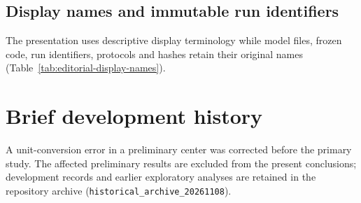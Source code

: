 \documentclass[smallextended,epjc3]{svjour3}
\begin{document}
\subsection{Display names and immutable run identifiers}
\label{sec:display_mapping}
The presentation uses descriptive display terminology while model files,
frozen code, run identifiers, protocols and hashes retain their original
names (Table~\ref{tab:editorial-display-names}).


\section{Brief development history}
A unit-conversion error in a preliminary center was corrected before the
primary study. The affected preliminary results are excluded from the present
conclusions; development records and earlier exploratory analyses are retained
in the repository archive (\texttt{historical\_archive\_20261108}).
\end{document}
